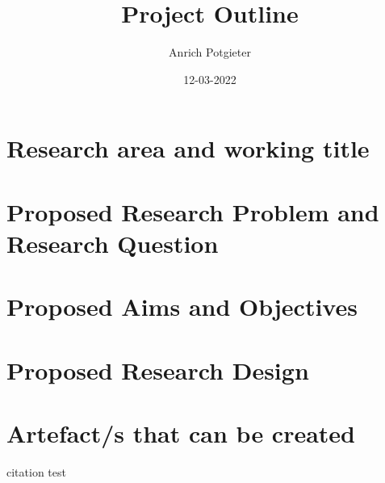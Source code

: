 \documentclass[12pt]{article}
\title{Project Outline}
\author{Anrich Potgieter}
\date{12-03-2022}
\begin{document}
\maketitle
\section{Research area and working title}
\section{Proposed Research Problem and Research Question}
\section{Proposed Aims and Objectives}
\section{Proposed Research Design}
\section{Artefact/s that can be created}
citation test \autocite{ApplicabilityAppropriatenessDistributed} 
\printbibliography
\end{document}

